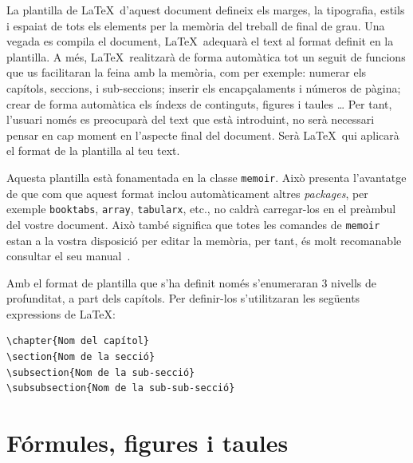La plantilla de \LaTeX\ d'aquest document defineix els marges, la tipografia, estils i espaiat de tots els elements per la memòria del treball de final de
grau. Una vegada es compila el document, \LaTeX\  adequarà el text al format definit en la plantilla. A més, \LaTeX\ realitzarà de forma
automàtica tot un seguit de funcions que us facilitaran la feina amb la memòria, com per exemple: numerar els capítols, seccions, i
sub-seccions; inserir els encapçalaments i números de pàgina; crear de forma automàtica els índexs de continguts, figures i taules \dots
Per tant, l'usuari només es preocuparà del text que està introduint, no serà necessari pensar en cap moment en l'aspecte final del
document. Serà \LaTeX\ qui aplicarà el format de la plantilla al teu text.

Aquesta plantilla està fonamentada en la classe \texttt{memoir}. Això presenta l'avantatge de que com que aquest format inclou automàticament altres \emph{packages}, per exemple \texttt{booktabs},
\texttt{array}, \texttt{tabularx}, etc., no caldrà carregar-los en el preàmbul del vostre document. Això també significa que totes les comandes de \texttt{memoir} estan a la vostra disposició per editar la memòria, per tant, és molt recomanable consultar el seu manual~\cite{Wil10}.

Amb el format de plantilla que s'ha definit només s'enumeraran 3 nivells de profunditat, a part dels capítols. Per definir-los s'utilitzaran les
següents expressions de \LaTeX:

\begin{verbatim}
\chapter{Nom del capítol}
\section{Nom de la secció}
\subsection{Nom de la sub-secció}
\subsubsection{Nom de la sub-sub-secció}
\end{verbatim}

\section{Fórmules, figures i taules}
